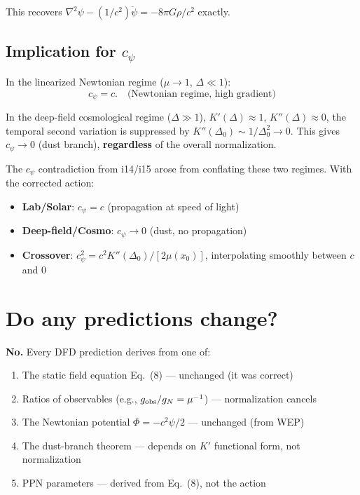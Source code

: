 \documentclass[aps,prd,twocolumn,nofootinbib]{revtex4-2}
\begin{document}
This recovers $\nabla^2\psi - (1/c^2)\ddot\psi = -8\pi G\rho/c^2$ exactly.

\subsection{Implication for $c_\psi$}

In the linearized Newtonian regime ($\mu \to 1$, $\Delta \ll 1$):
\begin{equation}
c_\psi = c. \quad\text{(Newtonian regime, high gradient)}
\end{equation}

In the deep-field cosmological regime ($\Delta \gg 1$),
$K'(\Delta) \approx 1$, $K''(\Delta) \approx 0$, the temporal second
variation is suppressed by $K''(\Delta_0) \sim 1/\Delta_0^2 \to 0$.
This gives $c_\psi \to 0$ (dust branch), \textbf{regardless} of the
overall normalization.

The $c_\psi$ contradiction from i14/i15 arose from conflating these two
regimes. With the corrected action:
\begin{itemize}
\item \textbf{Lab/Solar}: $c_\psi = c$ (propagation at speed of light)
\item \textbf{Deep-field/Cosmo}: $c_\psi \to 0$ (dust, no propagation)
\item \textbf{Crossover}: $c_\psi^2 = c^2 K''(\Delta_0)/[2\mu(x_0)]$,
  interpolating smoothly between $c$ and $0$
\end{itemize}

\section{Do any predictions change?}
\label{sec:predictions}

\textbf{No.} Every DFD prediction derives from one of:
\begin{enumerate}
\item The static field equation Eq.~(8) --- unchanged (it was correct)
\item Ratios of observables (e.g., $g_{\rm obs}/g_N = \mu^{-1}$) ---
  normalization cancels
\item The Newtonian potential $\Phi = -c^2\psi/2$ --- unchanged (from WEP)
\item The dust-branch theorem --- depends on $K'$ functional form, not
  normalization
\item PPN parameters --- derived from Eq.~(8), not the action
\end{enumerate}
\end{document}
